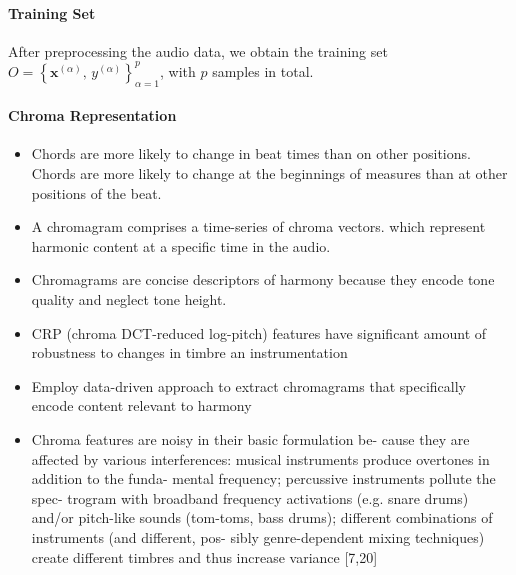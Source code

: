 \documentclass{scrartcl}
\begin{document}


\paragraph{Training Set} 
After preprocessing the audio data, we obtain the training set $ O = \left\{ \mathbf x^{(\alpha)}, \, y^{(\alpha)} \right \}_{\alpha = 1}^p$, with $p$ samples in total. 




\paragraph{Chroma Representation}

\begin{itemize}
\item Chords are more likely to change in beat times than on other positions. Chords are more likely to change at the beginnings of measures than at other positions of the beat.
\item A chromagram comprises a time-series of chroma vectors. which represent harmonic content at a specific time in the audio.
\item Chromagrams are concise descriptors of harmony because they encode tone quality and neglect tone height.
\item CRP (chroma DCT-reduced log-pitch) features have significant amount of robustness to changes in timbre an instrumentation \cite[Mueller2010]{Mueller2010}
\item Employ data-driven approach to extract chromagrams that specifically encode content relevant to harmony 
\item Chroma features are noisy in their basic formulation be- cause they are affected by various interferences: musical instruments produce overtones in addition to the funda- mental frequency; percussive instruments pollute the spec- trogram with broadband frequency activations (e.g. snare drums) and/or pitch-like sounds (tom-toms, bass drums); different combinations of instruments (and different, pos- sibly genre-dependent mixing techniques) create different timbres and thus increase variance [7,20] \cite{Korzeniowski2016}
\end{itemize}
\end{document}

